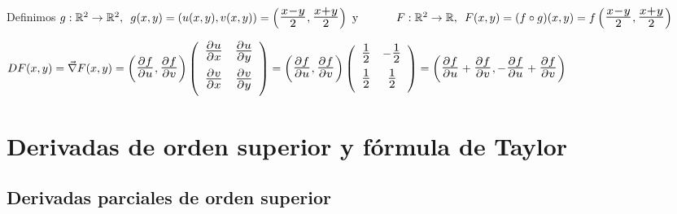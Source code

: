 \documentclass[10pt, titlepage]{article}
\newcommand{\R}{\mathbb{R}}
\newcommand{\bfrac}[2]{\scalebox{1.4}{$\frac{#1}{#2}$}}
\newcommand{\spac}{\, \, \,}
\newcommand{\dindent}{\indent\indent}
\begin{document}
\dindent Definimos $g : \R^2 \to \R^2,\spac g (x, y) = (u (x, y), v (x, y)) =  \left ( \bfrac{x - y}{2}, 
\bfrac{x + y}{2} \right ) \text{ y } \\ \dindent F : \R^2 \to \R, \spac F (x, y) = (f \circ g) (x, y) = f 
\left ( \bfrac{x - y}{2}, \bfrac{x + y}{2} \right )$
\vspace{3mm}

$DF (x, y) = \vec{\nabla} F (x, y) = \left ( \bfrac{\partial f}{\partial u}, \bfrac{\partial f}{\partial v} \right )
\left ( \begin{array}{cc}

\bfrac{\partial u}{\partial x} & \bfrac{\partial u}{\partial y}\vspace{2mm}\\
\bfrac{\partial v}{\partial x} & \bfrac{\partial v}{\partial y}\vspace{2mm}\\

\end{array} \right )
= \left ( \bfrac{\partial f}{\partial u}, \bfrac{\partial f}{\partial v} \right ) 
\left ( \begin{array}{cc}

\bfrac{1}{2} & -\bfrac{1}{2}\vspace{2mm}\\
\bfrac{1}{2} &\bfrac{1}{2}\vspace{2mm}\\

\end{array} \right )
= \left ( \bfrac{\partial f}{\partial u} + \bfrac{\partial f}{\partial v}, -\bfrac{\partial f}{\partial u} + 
\bfrac{\partial f}{\partial v} \right )$

\vspace{7mm}


\section{Derivadas de orden superior y fórmula de Taylor}
\vspace{5mm}


\subsection{Derivadas parciales de orden superior}
\vspace{5mm}
\end{document}
